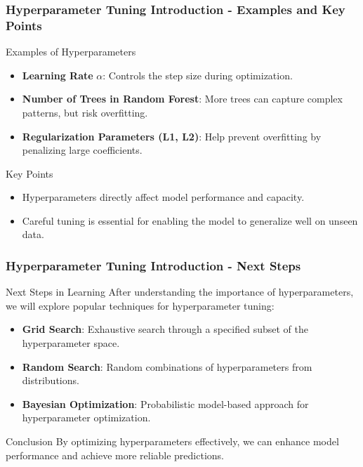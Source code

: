 \documentclass{beamer}
\begin{document}
\begin{frame}[fragile]
    \frametitle{Hyperparameter Tuning Introduction - Examples and Key Points}
    \begin{block}{Examples of Hyperparameters}
        \begin{itemize}
            \item \textbf{Learning Rate} $\alpha$: Controls the step size during optimization.
            \item \textbf{Number of Trees in Random Forest}: More trees can capture complex patterns, but risk overfitting.
            \item \textbf{Regularization Parameters (L1, L2)}: Help prevent overfitting by penalizing large coefficients.
        \end{itemize}
    \end{block}
    \begin{block}{Key Points}
        \begin{itemize}
            \item Hyperparameters directly affect model performance and capacity.
            \item Careful tuning is essential for enabling the model to generalize well on unseen data.
        \end{itemize}
    \end{block}
\end{frame}

\begin{frame}[fragile]
    \frametitle{Hyperparameter Tuning Introduction - Next Steps}
    \begin{block}{Next Steps in Learning}
        After understanding the importance of hyperparameters, we will explore popular techniques for hyperparameter tuning:
        \begin{itemize}
            \item \textbf{Grid Search}: Exhaustive search through a specified subset of the hyperparameter space.
            \item \textbf{Random Search}: Random combinations of hyperparameters from distributions.
            \item \textbf{Bayesian Optimization}: Probabilistic model-based approach for hyperparameter optimization.
        \end{itemize}
    \end{block}
    \begin{block}{Conclusion}
        By optimizing hyperparameters effectively, we can enhance model performance and achieve more reliable predictions.
    \end{block}
\end{frame}
\end{document}
